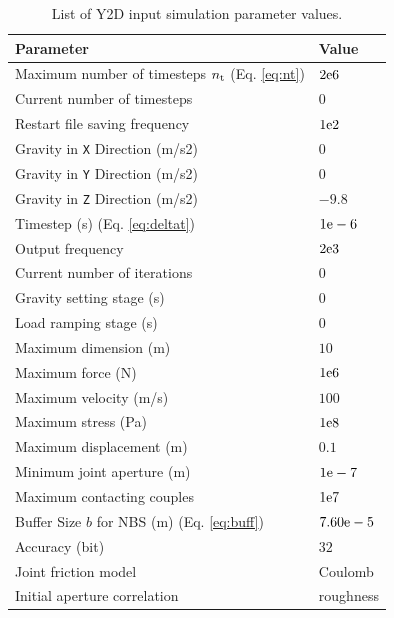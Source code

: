 \begin{table}[t]
  \caption{List of Y2D input simulation parameter values.}
  \begin{tabularx}{\columnwidth}{ll}
    Parameter                               & Value                     \\\midrule
    Maximum number of timesteps $n_{\rm{t}}$ (Eq. \ref{eq:nt})& $2{\rm{e}}6$         \\
    Current number of timesteps             & $0$                       \\
    Restart file saving frequency           & $1{\rm{e}}2$              \\
    Gravity in \texttt{X} Direction (m/s2)  & $0$                       \\
    Gravity in \texttt{Y} Direction (m/s2)  & $0$                       \\
    Gravity in \texttt{Z} Direction (m/s2)  & $-9.8$                    \\
    Timestep (s) (Eq. \ref{eq:deltat})      & $1{\rm{e}}-6$             \\
    Output frequency                        & $2{\rm{e}}3$              \\
    Current number of iterations            & $0$                       \\
    Gravity setting stage (s)               & $0$                       \\
    Load ramping stage (s)                  & $0$                       \\
    Maximum dimension (m)                   & $10$                      \\
    Maximum force (N)                       & $1{\rm{e}}6$              \\
    Maximum velocity (m/s)                  & $100$                     \\
    Maximum stress (Pa)                     & $1{\rm{e}}8$              \\
    Maximum displacement (m)                & $0.1$                     \\
    Minimum joint aperture (m)              & $1{\rm{e}}-7$             \\
    Maximum contacting couples              & $1{\rm{e}}7$              \\
    Buffer Size $b$ for NBS (m) (Eq. \ref{eq:buff})& $7.60{\rm{e}}-5$       \\
    Accuracy (bit)                          & $32$                      \\
    Joint friction model                    & {\small Coulomb}          \\
    Initial aperture correlation            & {\small roughness}        \\\bottomrule
  \end{tabularx}
  \label{tab:simpar}
\end{table}

